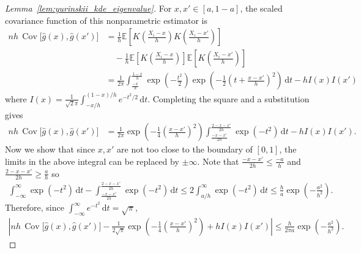 \documentclass[11pt,lof]{puthesis}
\newcommand{\E}{\ensuremath{\mathbb{E}}}
\DeclareMathOperator{\Cov}{Cov}
\newcommand{\diff}[1]{\,\mathrm{d}#1}
\theoremstyle{break}
\theoremstyle{proof}
\newtheorem{proof}{Proof}
\begin{document}
\begin{proof}[Lemma~\ref{lem:yurinskii_kde_eigenvalue}]

  For $x, x' \in [a, 1-a]$, the scaled covariance function
  of this nonparametric estimator is
  \begin{align*}
    n h\, \Cov\big[\hat g(x), \hat g(x')\big]
    &=
    \frac{1}{h}
    \E \left[
      K \left( \frac{X_i - x}{h} \right)
      K \left( \frac{X_i - x'}{h} \right)
    \right] \\
    &\quad-
    \frac{1}{h}
    \E \left[
      K \left( \frac{X_i - x}{h} \right)
    \right]
    \E \left[
      K \left( \frac{X_i - x'}{h} \right)
    \right] \\
    &=
    \frac{1}{2 \pi}
    \int_{\frac{-x}{h}}^{\frac{1-x}{h}}
    \exp \left( - \frac{t^2}{2} \right)
    \exp \left( - \frac{1}{2} \left( t + \frac{x - x'}{h} \right)^2 \right)
    \diff t
    - h I(x) I(x')
  \end{align*}
  where $I(x) = \frac{1}{\sqrt 2 \pi} \int_{-x/h}^{(1-x)/h} e^{-t^2/2} \diff t$.
  Completing the square and a substitution gives
  \begin{align*}
    n h\, \Cov\big[\hat g(x), \hat g(x')\big]
    &=
    \frac{1}{2 \pi}
    \exp \left( - \frac{1}{4} \left( \frac{x-x'}{h} \right)^2 \right)
    \int_{\frac{-x-x'}{2h}}^{\frac{2-x-x'}{2h}}
    \exp \left(-t^2\right)
    \diff t
    - h I(x) I(x').
  \end{align*}
  Now we show that since $x, x'$ are not too close to the boundary
  of $[0,1]$,
  the limits in the above integral can be replaced by $\pm \infty$.
  Note that $\frac{-x-x'}{2h} \leq \frac{-a}{h}$
  and $\frac{2-x-x'}{2h} \geq \frac{a}{h}$ so
  \begin{align*}
    \int_{-\infty}^{\infty}
    \exp \left(-t^2\right)
    \diff t
    - \int_{\frac{-x-x'}{2h}}^{\frac{2-x-x'}{2h}}
    \exp \left(-t^2\right)
    \diff t
    \leq
    2 \int_{a/h}^\infty
    \exp \left(-t^2\right)
    \diff t
    \leq
    \frac{h}{a}
    \exp \left(- \frac{a^2}{h^2}\right).
  \end{align*}
  Therefore, since
  $\int_{-\infty}^{\infty} e^{-t^2} \diff t = \sqrt \pi$,
  \begin{align*}
    \left|
    n h\, \Cov\big[\hat g(x), \hat g(x')\big]
    - \frac{1}{2 \sqrt \pi}
    \exp \left( - \frac{1}{4} \left( \frac{x-x'}{h} \right)^2 \right)
    + h I(x) I(x')
    \right|
    \leq
    \frac{h}{2 \pi a}
    \exp \left(- \frac{a^2}{h^2}\right).
  \end{align*}

\end{proof}
\end{document}
